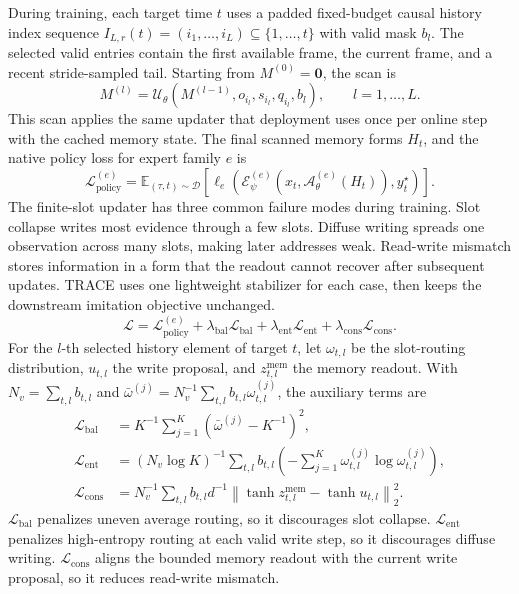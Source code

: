 \documentclass{article}
\begin{document}
During training, each target time $t$ uses a padded fixed-budget causal history index sequence $I_{L,r}(t)=(i_1,\ldots,i_L)\subseteq\{1,\ldots,t\}$ with valid mask $b_l$. The selected valid entries contain the first available frame, the current frame, and a recent stride-sampled tail. Starting from $M^{(0)}=\mathbf{0}$, the scan is
\begin{equation}
    M^{(l)}
    =
    \mathcal{U}_{\theta}
    (M^{(l-1)},o_{i_l},s_{i_l},q_{i_l},b_l),
    \qquad
    l=1,\ldots,L.
    \label{eq:history_scan}
\end{equation}
This scan applies the same updater that deployment uses once per online step with the cached memory state. The final scanned memory forms $H_t$, and the native policy loss for expert family $e$ is
\begin{equation}
    \mathcal{L}_{\mathrm{policy}}^{(e)}
    =
    \mathbb{E}_{(\tau,t)\sim\mathcal{D}}
    \left[
    \ell_e\!\left(
    \mathcal{E}_{\psi}^{(e)}
    (x_t,\mathcal{A}^{(e)}_{\theta}(H_t)),
    y_t^\star
    \right)
    \right].
    \label{eq:native_policy_loss}
\end{equation}
The finite-slot updater has three common failure modes during training. Slot collapse writes most evidence through a few slots. Diffuse writing spreads one observation across many slots, making later addresses weak. Read-write mismatch stores information in a form that the readout cannot recover after subsequent updates. TRACE uses one lightweight stabilizer for each case, then keeps the downstream imitation objective unchanged.
\begin{equation}
    \mathcal{L}
    =
    \mathcal{L}_{\mathrm{policy}}^{(e)}
    +
    \lambda_{\mathrm{bal}}\mathcal{L}_{\mathrm{bal}}
    +
    \lambda_{\mathrm{ent}}\mathcal{L}_{\mathrm{ent}}
    +
    \lambda_{\mathrm{cons}}\mathcal{L}_{\mathrm{cons}}.
    \label{eq:total_loss}
\end{equation}
For the $l$-th selected history element of target $t$, let $\omega_{t,l}$ be the slot-routing distribution, $u_{t,l}$ the write proposal, and $z_{t,l}^{\mathrm{mem}}$ the memory readout. With $N_v=\sum_{t,l}b_{t,l}$ and $\bar\omega^{(j)}=N_v^{-1}\sum_{t,l}b_{t,l}\omega_{t,l}^{(j)}$, the auxiliary terms are
\begin{align}
    \mathcal{L}_{\mathrm{bal}}
    &=
    K^{-1}\sum_{j=1}^{K}
    \left(\bar\omega^{(j)}-K^{-1}\right)^2,
    \\
    \mathcal{L}_{\mathrm{ent}}
    &=
    (N_v\log K)^{-1}
    \sum_{t,l}b_{t,l}
    \left(
    -\sum_{j=1}^{K}
    \omega_{t,l}^{(j)}\log\omega_{t,l}^{(j)}
    \right),
    \\
    \mathcal{L}_{\mathrm{cons}}
    &=
    N_v^{-1}
    \sum_{t,l}b_{t,l}
    d^{-1}
    \left\|
    \tanh z_{t,l}^{\mathrm{mem}}
    -
    \tanh u_{t,l}
    \right\|_2^2 .
    \label{eq:memory_regularizers}
\end{align}
$\mathcal{L}_{\mathrm{bal}}$ penalizes uneven average routing, so it discourages slot collapse. $\mathcal{L}_{\mathrm{ent}}$ penalizes high-entropy routing at each valid write step, so it discourages diffuse writing. $\mathcal{L}_{\mathrm{cons}}$ aligns the bounded memory readout with the current write proposal, so it reduces read-write mismatch.
\end{document}
